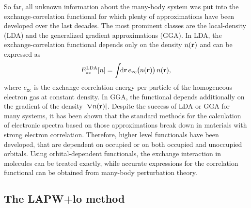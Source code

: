 \newpage
So far, all unknown information about the many-body system was put into the exchange-correlation functional for which plenty of approximations have been developed over the last decades. The most prominent classes are the local-density (LDA) and the generalized gradient approximations (GGA)\cite{bechstedt2016many}. In LDA, the exchange-correlation functional depends only on the density $n(\mathbf{r})$ and can be expressed as 
%
\begin{align}
    E^\text{LDA}_\text{xc}[n] = \int\text{\!\!d}\mathbf{r}\,e_\text{xc}\bigl(n(\mathbf{r})\bigr)\,n(\mathbf{r}),
\end{align}
%
where $e_\text{xc}$ is the exchange-correlation energy per particle of the homogeneous electron gas at constant density. In GGA, the functional depends additionally on the  gradient of the density $|\nabla n(\mathbf{r})|$. Despite the success of LDA or GGA for many systems, it has been shown that the standard methods for the calculation of electronic spectra based on those approximations break down in materials with strong electron correlation\cite{rpa_correlation_energies}. Therefore, higher level functionals have been developed, that are dependent on occupied or on both occupied and unoccupied orbitals. Using orbital-dependent functionals, the exchange interaction in molecules can be treated exactly\cite{exact_exchange,exact_exchange2}, while  accurate expressions for the correlation functional can be obtained from many-body perturbation theory\cite{mbpt_correlation,mbpt_correlation2}.\par


\subsection{The LAPW+lo method}

